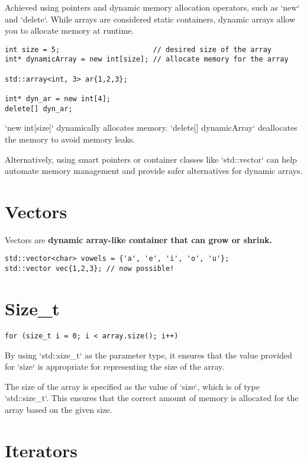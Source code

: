 Achieved using pointers and dynamic memory allocation operators, such as `new` and `delete`. 
While arrays are considered static containers,
dynamic arrays allow you to allocate memory at runtime.

\begin{verbatim}
int size = 5;                      // desired size of the array
int* dynamicArray = new int[size]; // allocate memory for the array

std::array<int, 3> ar{1,2,3};

int* dyn_ar = new int[4];
delete[] dyn_ar;
\end{verbatim}

`new int[size]` dynamically allocates memory. 
`delete[] dynamicArray` deallocates the memory to avoid memory leaks.

Alternatively, using smart pointers or container classes like `std::vector` can help automate memory management
and provide safer alternatives for dynamic arrays.

\section{Vectors}

Vectors are \textbf{dynamic array-like container that can grow or shrink.}

\begin{verbatim}
std::vector<char> vowels = {'a', 'e', 'i', 'o', 'u'};
std::vector vec{1,2,3}; // now possible! 
\end{verbatim}

\section{Size\_t}

\begin{verbatim}
for (size_t i = 0; i < array.size(); i++) 
\end{verbatim}

By using `std::size\_t` as the parameter type, 
it ensures that the value provided for `size` is appropriate for representing the size of the array.

The size of the array is specified as the value of `size`, which is of type `std::size\_t`. 
This ensures that the correct amount of memory is allocated for the array based on the given size.

\section{Iterators}
